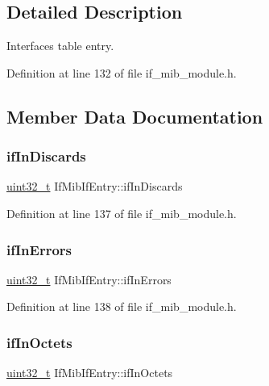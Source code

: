 \subsection{Detailed Description}
Interfaces table entry. 

Definition at line 132 of file if\+\_\+mib\+\_\+module.\+h.



\subsection{Member Data Documentation}
\mbox{\label{structIfMibIfEntry_af87be9e678bf819eae6d9b71748811db}} 
\subsubsection{\texorpdfstring{if\+In\+Discards}{ifInDiscards}}
{\footnotesize\ttfamily \hyperlink{stdint_8h_a435d1572bf3f880d55459d9805097f62}{uint32\+\_\+t} If\+Mib\+If\+Entry\+::if\+In\+Discards}



Definition at line 137 of file if\+\_\+mib\+\_\+module.\+h.

\mbox{\label{structIfMibIfEntry_ab1f9925512bfa34b85b5258c56d1307e}} 
\subsubsection{\texorpdfstring{if\+In\+Errors}{ifInErrors}}
{\footnotesize\ttfamily \hyperlink{stdint_8h_a435d1572bf3f880d55459d9805097f62}{uint32\+\_\+t} If\+Mib\+If\+Entry\+::if\+In\+Errors}



Definition at line 138 of file if\+\_\+mib\+\_\+module.\+h.

\mbox{\label{structIfMibIfEntry_a5648d4f845dd71b19056524184c68ee5}} 
\subsubsection{\texorpdfstring{if\+In\+Octets}{ifInOctets}}
{\footnotesize\ttfamily \hyperlink{stdint_8h_a435d1572bf3f880d55459d9805097f62}{uint32\+\_\+t} If\+Mib\+If\+Entry\+::if\+In\+Octets}



